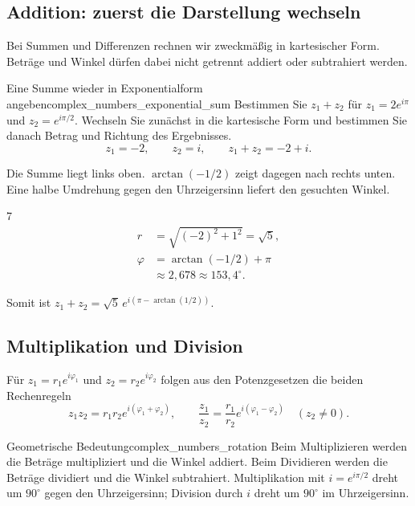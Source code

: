 \subsection{Addition: zuerst die Darstellung wechseln}
Bei Summen und Differenzen rechnen wir zweckmäßig in kartesischer Form.
Beträge und Winkel dürfen dabei nicht getrennt addiert oder subtrahiert werden.
\begin{ExampleBox}{Eine Summe wieder in Exponentialform angeben}{complex_numbers_exponential_sum}
  Bestimmen Sie $z_1+z_2$ für $z_1=2e^{i\pi}$ und $z_2=e^{i\pi/2}$.
  Wechseln Sie zunächst in die kartesische Form und bestimmen Sie danach
  Betrag und Richtung des Ergebnisses.
  \[
    z_1=-2,\qquad z_2=i,\qquad z_1+z_2=-2+i.
  \]
  \par\smallskip
  \begin{minipage}[c]{0.46\linewidth}
  \end{minipage}\hfill
  \begin{minipage}[c]{0.49\linewidth}
    Die Summe liegt links oben. $\arctan(-1/2)$ zeigt dagegen nach rechts
    unten. Eine halbe Umdrehung gegen den Uhrzeigersinn liefert den
    gesuchten Winkel.
    \begin{ClozeArea}[16]{7}
      \[
        \begin{aligned}
          r&=\sqrt{(-2)^2+1^2}=\sqrt5,\\[5pt]
          \varphi&=\arctan(-1/2)+\pi\\[5pt]
                 &\approx2{,}678\approx153{,}4^\circ.
        \end{aligned}
      \]
    \end{ClozeArea}
  \end{minipage}
  \par\medskip
  Somit ist $z_1+z_2=\sqrt5\,e^{i(\pi-\arctan(1/2))}$.
\end{ExampleBox}

\subsection{Multiplikation und Division}
Für $z_1=r_1e^{i\varphi_1}$ und $z_2=r_2e^{i\varphi_2}$ folgen aus den
Potenzgesetzen die beiden Rechenregeln
\[
  z_1z_2=r_1r_2e^{i(\varphi_1+\varphi_2)},\qquad
  \frac{z_1}{z_2}=\frac{r_1}{r_2}e^{i(\varphi_1-\varphi_2)}\quad(z_2\ne0).
\]
\begin{KeyPointBox}{Geometrische Bedeutung}{complex_numbers_rotation}
  Beim Multiplizieren werden die Beträge multipliziert und die Winkel addiert.
  Beim Dividieren werden die Beträge dividiert und die Winkel subtrahiert.
  Multiplikation mit $i=e^{i\pi/2}$ dreht um $90^\circ$ gegen den Uhrzeigersinn;
  Division durch $i$ dreht um $90^\circ$ im Uhrzeigersinn.
\end{KeyPointBox}

